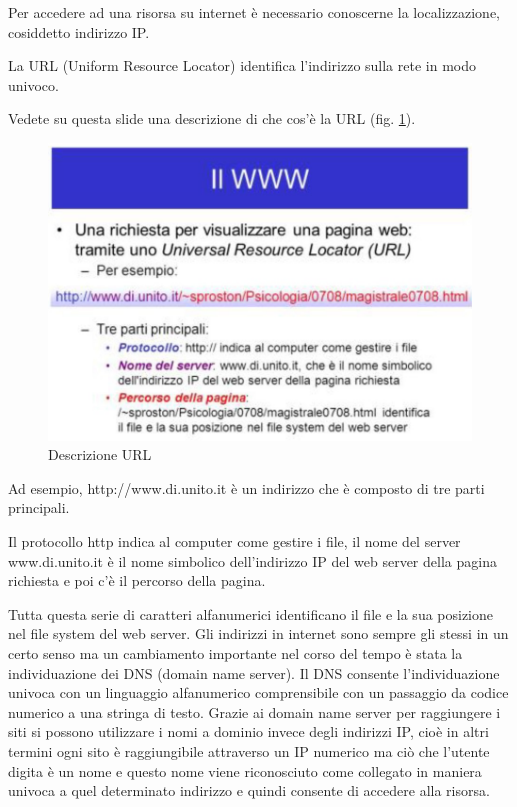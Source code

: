 Per accedere ad una risorsa su internet è necessario conoscerne la localizzazione, cosiddetto indirizzo IP.

La URL (Uniform Resource Locator) identifica l'indirizzo sulla rete in modo univoco.

Vedete su questa slide una descrizione di che cos'è la URL (fig. \ref{fig:descrizione_URL}).

\begin{figure}[ht]
    \centering
    \includegraphics[width=0.9\linewidth]{images/03_lez_fig_07.jpg}
    \caption{Descrizione URL}
    \label{fig:descrizione_URL}
\end{figure}

Ad esempio, http://www.di.unito.it è un indirizzo che è composto di tre parti principali.

Il protocollo http indica al computer come gestire i file, il nome del server www.di.unito.it è il nome simbolico dell'indirizzo IP del web server della pagina richiesta e poi c'è il percorso della pagina.

Tutta questa serie di caratteri alfanumerici identificano il file e la sua posizione nel file system del web server. 
Gli indirizzi in internet sono sempre gli stessi in un certo senso ma un cambiamento importante nel corso del tempo è stata la individuazione dei DNS (domain name server). 
Il DNS consente l'individuazione univoca con un linguaggio alfanumerico comprensibile con un passaggio da codice numerico a una stringa di testo. Grazie ai domain name server per raggiungere i siti si possono utilizzare i nomi a dominio invece degli indirizzi IP, cioè in altri termini ogni sito è raggiungibile attraverso un IP numerico ma ciò che l'utente digita è un nome e questo nome viene riconosciuto come collegato in maniera univoca a quel determinato indirizzo e quindi consente di accedere alla risorsa.

